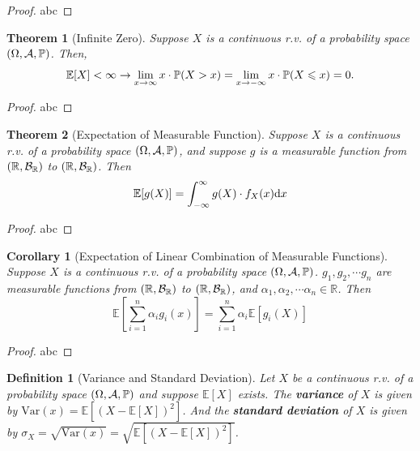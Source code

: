 \documentclass[openany,12pt]{book}
\newtheorem{theorem}{Theorem}[chapter]
\newtheorem{corollary}{Corollary}[chapter]
\newtheorem{definition}{Definition}[chapter]
\begin{document}
\begin{proof}
  abc
\end{proof}

\begin{theorem}[Infinite Zero]
  Suppose $X$ is a continuous r.v. of a probability space $(\Omega,\mathcal{A},\mathbb{P})$. Then,
  $$
    \mathbb{E}[ X] < \infty \to \lim_{x \to \infty}{x \cdot \mathbb{P}(X > x)} = \lim_{x \to - \infty}{x \cdot \mathbb{P}(X \leqslant x)} = 0.
  $$
\end{theorem}

\begin{proof}
  abc
\end{proof}

\begin{theorem}[Expectation of Measurable Function]
  Suppose $X$ is a continuous r.v. of a probability space $(\Omega,\mathcal{A},\mathbb{P})$, and suppose $g$ is a measurable function from $(\mathbb{R},\mathcal{B}_\mathbb{R})$ to $(\mathbb{R},\mathcal{B}_\mathbb{R})$.
  Then
  \[\mathbb{E}[ g(X)] = \int_{- \infty}^{\infty}{g(X)} \cdot f_{X}(x)\mathrm{d} x\]
\end{theorem}

\begin{proof}
  abc
\end{proof}

\begin{corollary}[Expectation of Linear Combination of Measurable Functions]
  Suppose $X$ is a continuous r.v. of a probability space $(\Omega,\mathcal{A},\mathbb{P})$. $g_1,g_2,\cdots g_n$ are measurable functions from $(\mathbb{R},\mathcal{B}_\mathbb{R})$ to $(\mathbb{R},\mathcal{B}_\mathbb{R})$, and $\alpha_1,\alpha_2,\cdots\alpha_n\in\mathbb{R}$. Then
  \[\mathbb{E}\left[ \sum_{i = 1}^{n}\alpha_{i}g_{i}(x) \right] = \sum_{i = 1}^{n}\alpha_{i}\mathbb{E}[ g_{i}(X)]\]
\end{corollary}

\begin{proof}
  abc
\end{proof}

\begin{definition}[Variance and Standard Deviation]
  Let $X$ be a continuous r.v. of a probability space $(\Omega,\mathcal{A},\mathbb{P})$ and suppose $\mathbb{E}[ X]$ exists. The \textbf{variance} of $X$ is given by $\mathrm{Var}(x)= \mathbb{E}[(X - \mathbb{E}[ X])^{2}]$. And the \textbf{standard deviation} of $X$ is given by
  $\sigma_{X} = \sqrt{\mathrm{Var}(x)} = \sqrt{\mathbb{E}[(X - \mathbb{E}[ X])^{2}]}$.
\end{definition}
\end{document}
